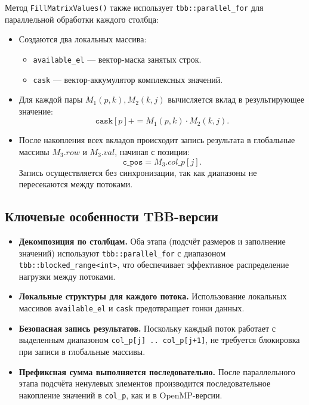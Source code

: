 \documentclass[12pt]{article}
\begin{document}
\begin{enumerate}
  Метод \texttt{FillMatrixValues()} также использует \texttt{tbb::parallel\_for} для параллельной обработки каждого столбца:

  \begin{itemize}
    \item Создаются два локальных массива:
    \begin{itemize}
      \item \texttt{available\_el} — вектор-маска занятых строк.
      \item \texttt{cask} — вектор-аккумулятор комплексных значений.
    \end{itemize}
    \item Для каждой пары \(M_1(p,k), M_2(k,j)\) вычисляется вклад в результирующее значение:
    \[
      \texttt{cask}[p] += M_1(p,k) \cdot M_2(k,j).
    \]
    \item После накопления всех вкладов происходит запись результата в глобальные массивы \(M_3.row\) и \(M_3.val\), начиная с позиции:
    \[
      \texttt{c\_pos} = M_3.col\_p[j].
    \]
    Запись осуществляется без синхронизации, так как диапазоны не пересекаются между потоками.
  \end{itemize}
\end{enumerate}

\subsection*{Ключевые особенности TBB-версии}

\begin{itemize}
  \item \textbf{Декомпозиция по столбцам.}  
  Оба этапа (подсчёт размеров и заполнение значений) используют \texttt{tbb::parallel\_for} с диапазоном \texttt{tbb::blocked\_range<int>}, что обеспечивает эффективное распределение нагрузки между потоками.
  
  \item \textbf{Локальные структуры для каждого потока.}  
  Использование локальных массивов \texttt{available\_el} и \texttt{cask} предотвращает гонки данных.
  
  \item \textbf{Безопасная запись результатов.}  
  Поскольку каждый поток работает с выделенным диапазоном \texttt{col\_p[j] .. col\_p[j+1]}, не требуется блокировка при записи в глобальные массивы.

  \item \textbf{Префиксная сумма выполняется последовательно.}  
  После параллельного этапа подсчёта ненулевых элементов производится последовательное накопление значений в \texttt{col\_p}, как и в OpenMP-версии.
\end{itemize}
\end{document}
